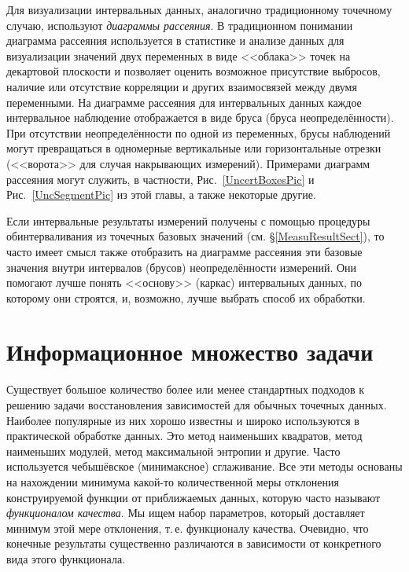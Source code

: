 \documentclass[a5paper,openany]{book}
\begin{document}
Для визуализации интервальных данных, аналогично традиционному точечному случаю, 
используют \emph{диаграммы рассеяния}. В традиционном понимании диаграмма рассеяния 
используется в статистике и анализе данных для визуализации значений двух переменных 
в виде <<облака>> точек на декартовой плоскости и позволяет оценить возможное 
присутствие выбросов, наличие или отсутствие корреляции и других взаимосвязей между 
двумя переменными. На диаграмме рассеяния для интервальных данных каждое интервальное 
наблюдение отображается в виде бруса (бруса неопределённости). При отсутствии 
неопределённости по одной из переменных, брусы наблюдений могут превращаться 
в одномерные вертикальные или горизонтальные отрезки (<<ворота>> для случая 
накрывающих измерений). Примерами диаграмм рассеяния 
могут служить, в частности, Рис.~\ref{UncertBoxesPic} и Рис.~\ref{UncSegmentPic} 
из этой главы, а также некоторые другие. 
  
Если интервальные результаты измерений получены с помощью процедуры обинтерваливания 
из точечных базовых значений (см. \S\ref{MeasuResultSect}), то часто имеет смысл также 
отобразить на диаграмме рассеяния эти базовые значения внутри интервалов (брусов) 
неопределённости измерений. Они помогают лучше понять <<основу>> (каркас) интервальных 
данных, по которому они строятся, и, возможно, лучше выбрать способ их обработки. 
  
  
  
\section{Информационное множество задачи} 
\label{InformSetSect} 
  
  
Существует большое количество более или менее стандартных подходов к решению задачи 
восстановления зависимостей для обычных точечных данных. Наиболее популярные из них 
хорошо известны и широко используются в практической обработке данных. Это метод 
наименьших квадратов, метод наименьших модулей, метод максимальной энтропии и другие. 
Часто используется чебышёвское (минимаксное) сглаживание. Все эти методы основаны 
на  нахождении минимума какой-то количественной меры отклонения конструируемой 
функции от приближаемых данных, которую часто называют \emph{функционалом качества}. 
 Мы ищем набор параметров, который доставляет минимум этой 
мере отклонения, т.\,е. функционалу качества. Очевидно, что конечные результаты 
существенно различаются в зависимости от конкретного вида этого  функционала. 
  
\end{document}
